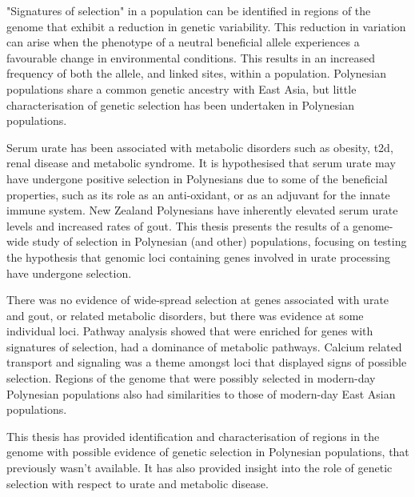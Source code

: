 "Signatures of selection" in a population can be identified in regions of the genome that exhibit a reduction in genetic variability. This reduction in variation can arise when the phenotype of a neutral beneficial allele experiences a favourable change in environmental conditions. This results in an increased frequency of both the allele, and linked sites, within a population. Polynesian populations share a common genetic ancestry with East Asia, but little characterisation of genetic selection has been undertaken in Polynesian populations.

Serum urate has been associated with metabolic disorders such as obesity, \gls{t2d}, renal disease and metabolic syndrome. It is hypothesised that serum urate may have undergone positive selection in Polynesians due to some of the beneficial properties, such as its role as an anti-oxidant, or as an adjuvant for the innate immune system. New Zealand Polynesians have inherently elevated serum urate levels and increased rates of gout. This thesis presents the results of a genome-wide study of selection in Polynesian (and other) populations, focusing on testing the hypothesis that genomic loci containing genes involved in urate processing have undergone selection.

There was no evidence of wide-spread selection at genes associated with urate and gout, or related metabolic disorders, but there was evidence at some individual loci. Pathway analysis showed that were enriched for genes with signatures of selection, had a dominance of metabolic pathways. Calcium related transport and signaling was a theme amongst loci that displayed signs of possible selection. Regions of the genome that were possibly selected in modern-day Polynesian populations also had similarities to those of modern-day East Asian populations.

This thesis has provided identification and characterisation of regions in the genome with possible evidence of genetic selection in Polynesian populations, that previously wasn't available. It has also provided insight into the role of genetic selection with respect to urate and metabolic disease.
